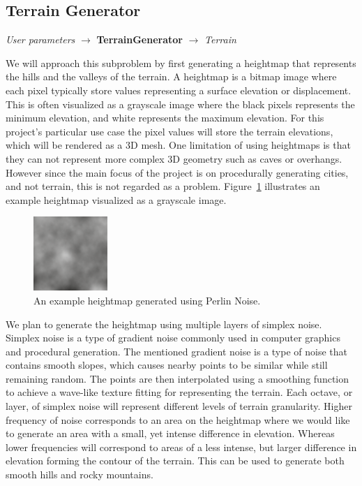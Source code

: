 \subsection{Terrain Generator}
\begin{center}
  \textit{User parameters} $\rightarrow$ \textbf{TerrainGenerator}  $\rightarrow$ \textit{Terrain}
\end{center}

We will approach this subproblem by first generating a heightmap that represents the hills and the valleys of the terrain.
A heightmap is a bitmap image where each pixel typically store values representing a surface elevation or displacement.
This is often visualized as a grayscale image where the black pixels represents the minimum elevation, and white represents the maximum elevation.
For this project's particular use case the pixel values will store the terrain elevations, which will be rendered as a 3D mesh.
One limitation of using heightmaps is that they can not represent more complex 3D geometry such as caves or overhangs.
However since the main focus of the project is on procedurally generating cities, and not terrain, this is not regarded as a problem.
Figure~\ref{fig:heightmap} illustrates an example heightmap visualized as a grayscale image.

\begin{figure}[h]
  \centering
  \includegraphics[width=0.25\textwidth]{figure/heightmap.png}
  \caption{An example heightmap generated using Perlin Noise.}
  \label{fig:heightmap}
\end{figure}

We plan to generate the heightmap using multiple layers of simplex noise.
Simplex noise is a type of gradient noise commonly used in computer graphics and procedural generation.
The mentioned gradient noise is a type of noise that contains smooth slopes, which causes nearby points to be similar while still remaining random.
The points are then interpolated using a smoothing function to achieve a wave-like texture fitting for representing the terrain.
Each octave, or layer, of simplex noise will represent different levels of terrain granularity.
Higher frequency of noise corresponds to an area on the heightmap where we would like to generate an area with a small, yet intense difference in elevation.
Whereas lower frequencies will correspond to areas of a less intense, but larger difference in elevation forming the contour of the terrain.
This can be used to generate both smooth hills and rocky mountains.

